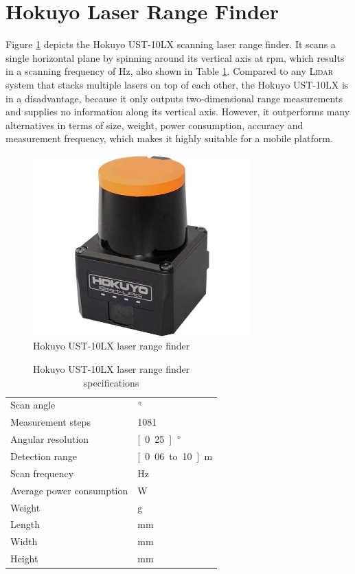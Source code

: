 \section{Hokuyo Laser Range Finder}
	\label{sec:hokuyo}
Figure \ref{pics:hokuyo} depicts the Hokuyo UST-10LX scanning laser range finder. It scans a single horizontal plane by spinning around its vertical axis at \unit[2400]{rpm}, which results in a scanning frequency of \unit[40]{Hz}, also shown in Table \ref{tab:hokuyo}. Compared to any \textsc{Lidar} system that stacks multiple lasers on top of each other, the Hokuyo UST-10LX is in a disadvantage, because it only outputs two-dimensional range measurements and supplies no information along its vertical axis. However, it outperforms many alternatives in terms of size, weight, power consumption, accuracy and measurement frequency, which makes it highly suitable for a mobile platform.


\begin{figure}[h]
   \centering
   \includegraphics[width=0.75\textwidth]{images/hokuyo.jpg}
   \caption{Hokuyo UST-10LX laser range finder}
   \label{pics:hokuyo}
\end{figure}

\begin{table}[h]
\begin{center}
 \caption{Hokuyo UST-10LX laser range finder specifications}\vspace{1ex}
 \label{tab:hokuyo}
 \begin{tabular}{ll}
 \hline
 Scan angle & \unit[250]{$\degree$} \\
 Measurement steps & 1081 \\
 Angular resolution & \unit[0.25]{$\degree$} \\
 Detection range & \unit[0.06 to 10]{m} \\
 Scan frequency & \unit[40]{Hz} \\
 Average power consumption & \unit[3]{W} \\
 Weight & \unit[130]{g} \\
 Length & \unit[50]{mm} \\
 Width & \unit[50]{mm} \\
 Height &  \unit[70]{mm} \\
 \hline
 \end{tabular}
\end{center}
\end{table}


